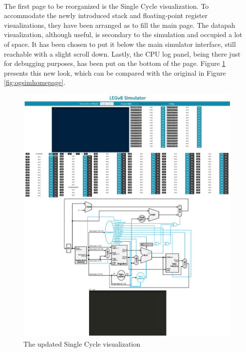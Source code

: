 \paragraph{}
The first page to be reorganized is the Single Cycle visualization. To accommodate the newly introduced stack and floating-point register visualizations, they have been arranged as to fill the main page. The datapah visualization, although useful, is secondary to the simulation and occupied a lot of space. It has been chosen to put it below the main simulator interface, still reachable with a slight scroll down. Lastly, the CPU log panel, being there just for debugging purposes, has been put on the bottom of the page. Figure \ref{fig:newsimhomepage} presents this new look, which can be compared with the original in Figure \ref{fig:ogsimhomepage}.
\begin{figure}[]
    \centering
    \includegraphics[width=1\linewidth]{img/new_single_cycle.jpeg}
    \caption{The updated Single Cycle visualization}
    \label{fig:newsimhomepage}
\end{figure}
